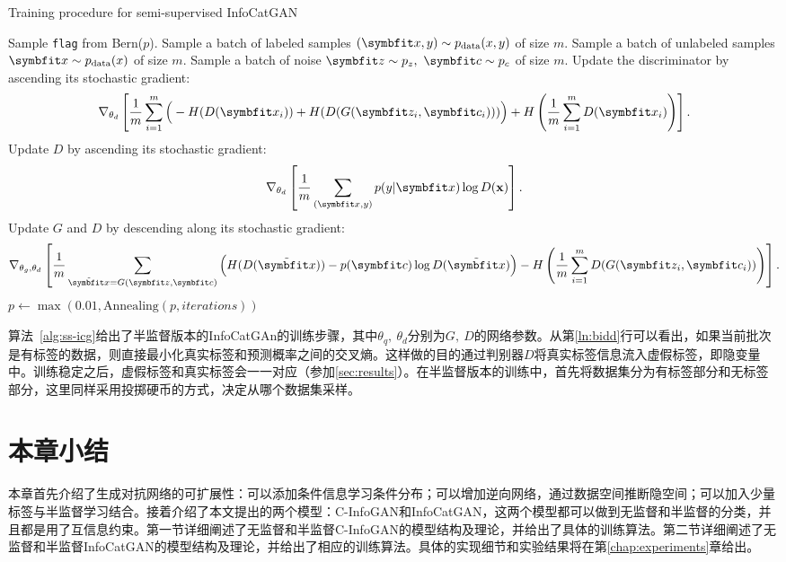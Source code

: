 \begin{algorithm}[htbp]
  \small
  \caption{Training procedure for semi-supervised InfoCatGAN}
  \label{alg:ss-icg}
  \begin{algorithmic}[1]
      \State Sample \texttt{flag} from Bern($p$).
        \State Sample a batch of labeled samples 
        $(\bd{x}, y) \sim p_{\text{data}}(x,y)$ of size $m$.
      \Else
        \State Sample a batch of unlabeled samples 
        $\bd{x} \sim p_{\text{data}}(x)$ of size $m$.
      \EndIf
      \State Sample a batch of noise $\bd{z}\sim p_z, ~\bd{c}\sim p_c$ of size
      $m$.
      \State Update the discriminator by ascending its stochastic gradient:
      \label{ln:catdss}
      \[
        \nabla_{\theta_d} \left[ 
          \frac{1}{m} \sum_{i=1}^m \Big( 
            - H(D(\bd{x}_i)) + H(D(G(\bd{z}_i, \bd{c}_i)))
          \Big) + H\left( \frac{1}{m}\sum_{i=1}^m D(\bd{x}_i) \right)
        \right].
      \]
        \State Update $D$ by ascending its stochastic gradient:
        \label{ln:bidd}
        \[
          \nabla_{\theta_d} \left[ 
            \frac{1}{m} \sum_{(\bd{x}, y)} p(y|\bd{x}) \log D(\bf{x}) 
          \right].
        \]
      \EndIf
      \State Update $G$ and $D$ by descending along its stochastic gradient:
      \label{ln:catgss}
      \[
        \nabla_{\theta_g,\theta_d} \left[ 
          \frac{1}{m} \sum_{\tilde{\bd{x}} = G(\bd{z},\bd{c})} \Big(
            H(D(\tilde{\bd{x}})) - p(\bd{c})\log D(\tilde{\bd{x}})
          \Big)
          - H \left( 
            \frac{1}{m}\sum_{i=1}^m D(G(\bd{z}_i, \bd{c}_i))
          \right)
        \right].
      \]
      \State $p \gets \max(0.01, \text{Annealing}(p, iterations))$ 
    \EndFor
  \end{algorithmic}
\end{algorithm}
算法~\ref{alg:ss-icg}给出了半监督版本的InfoCatGAn的训练步骤，其中$\theta_q,~\theta_d$分别为$G,~D$的网络参数。从第\ref{ln:bidd}行可以看出，如果当前批次是有标签的数据，则直接最小化真实标签和预测概率之间的交叉熵。这样做的目的通过判别器$D$将真实标签信息流入虚假标签，即隐变量中。训练稳定之后，虚假标签和真实标签会一一对应（参加\ref{sec:results}）。在半监督版本的训练中，首先将数据集分为有标签部分和无标签部分，这里同样采用投掷硬币的方式，决定从哪个数据集采样。

\section{本章小结}
本章首先介绍了生成对抗网络的可扩展性：可以添加条件信息学习条件分布；可以增加逆向网络，通过数据空间推断隐空间；可以加入少量标签与半监督学习结合。接着介绍了本文提出的两个模型：C-InfoGAN和InfoCatGAN，这两个模型都可以做到无监督和半监督的分类，并且都是用了互信息约束。第一节详细阐述了无监督和半监督C-InfoGAN的模型结构及理论，并给出了具体的训练算法。第二节详细阐述了无监督和半监督InfoCatGAN的模型结构及理论，并给出了相应的训练算法。具体的实现细节和实验结果将在第\ref{chap:experiments}章给出。
